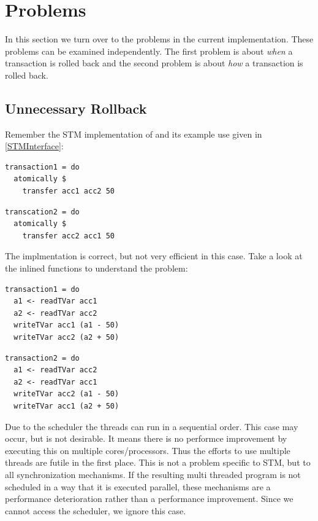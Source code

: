 \section{Problems}
In this section we turn over to the problems in the current implementation. These problems can be examined independently. The first problem is about
\textit{when} a transaction is rolled back and the second problem is about \textit{how} a transaction is rolled back.

\subsection{Unnecessary Rollback}
\label{Prob:UnRo}
Remember the STM implementation of  and its example use given in \ref{STMInterface}: 
\par\noindent
\begin{minipage}[t]{.45\textwidth}
\begin{lstlisting}[frame=lrtb]
transaction1 = do
  atomically $
    transfer acc1 acc2 50
\end{lstlisting}
\end{minipage}
\hfill
\begin{minipage}[t]{.45\textwidth}
\begin{lstlisting}[frame=lrtb]
transcation2 = do 
  atomically $ 
    transfer acc2 acc1 50
\end{lstlisting}
\end{minipage}
The implmentation is correct, but not very efficient in this case. Take a look at the inlined functions to understand the 
problem:
\par\noindent
\begin{minipage}[t]{.45\textwidth}
\begin{lstlisting}[frame=lrtb]
transaction1 = do
  a1 <- readTVar acc1
  a2 <- readTVar acc2
  writeTVar acc1 (a1 - 50)
  writeTVar acc2 (a2 + 50)
\end{lstlisting}
\end{minipage}
\hfill
\begin{minipage}[t]{.45\textwidth}
\begin{lstlisting}[frame=lrtb]
transaction2 = do 
  a1 <- readTVar acc2
  a2 <- readTVar acc1
  writeTVar acc2 (a1 - 50)
  writeTVar acc1 (a2 + 50)
\end{lstlisting}
\end{minipage}

Due to the scheduler the threads can run in a sequential order. This case may occur, but is not desirable. It means 
there is no performce improvement by executing this on multiple cores/processors. Thus the efforts to use multiple
threads are futile in the first place. This is not a problem specific to STM, but to all synchronization mechanisms. 
If the resulting multi threaded program is not scheduled in a way that it is executed parallel, these mechanisms are a
performance deterioration rather than a performance improvement. Since we cannot access the scheduler, we ignore 
this case. 

